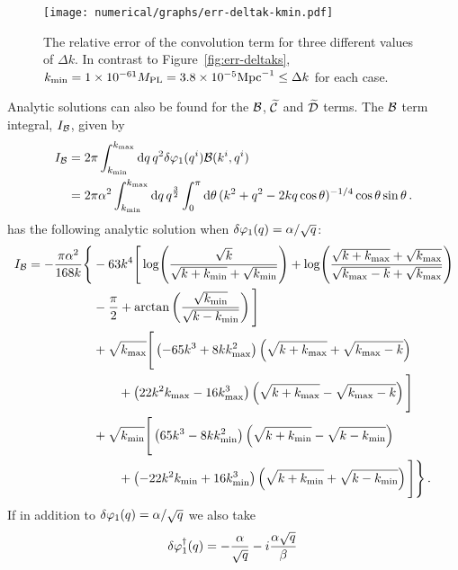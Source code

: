 \begin{figure}[htb]
 \centering
 \texttt{[image: numerical/graphs/err-deltak-kmin.pdf]}
 \caption[Relative error of the convolution term with fixed $\kmin$]{The 
relative error of the convolution term for three different values of $\Delta k$. In
contrast to Figure~\ref{fig:err-deltaks}, $k_{\mathrm{min}}=1\times 10^{-61}M_{\mathrm{PL}}=3.8\times 10^{-5}\mathrm{Mpc}^{-1} \le
\Delta k$ for each case.}
 \label{fig:err-deltak-kmin}
\end{figure}
 
% 
% 
Analytic solutions can also be found for the $\mathcal{B}$, $\widetilde{\mathcal{C}}$ and $\widetilde{\mathcal{D}}$ terms.
The $\mathcal{B}$ term integral, $I_{\mathcal{B}}$, given by
% 
\begin{align}
 \label{eq:bintegral-num}
I_\B &= 2\pi \int_{\kmin}^{\kmax} \d q\, q^2\dvp1(\qvi)\B(\kvi,\qvi) \nonumber\\
% 
     &= 2\pi\alpha^2 \int_{\kmin}^{\kmax} \d q\, q^{\frac{3}{2}}
\int_{0}^{\pi} \d\theta\, (k^2 + q^2 -2k q \cos{\theta})^{-1/4}
\cos{\theta}\sin{\theta}\,. 
\end{align}
% 
has the following analytic solution when $\delta\varphi_{1}(q) = \alpha/\sqrt{q}$:
% 
\begin{align}
\label{eq:intb-soln-num}
 I_\B = -\frac{\pi\alpha^2}{168 k}\Bigg\{ 
	&-63 k^4 \Bigg[ \log\Biggl(\frac{\sqrt{k}}{\sqrt{k+\kmin} + \sqrt{\kmin}}
			    \Biggr)
	 + \log\Biggl( \frac{\sqrt{k+\kmax} +\sqrt{\kmax}}{\sqrt{\kmax-k} +
		      \sqrt{\kmax}}\Biggr) \nonumber \\
	&-\frac{\pi}{2} + \arctan\left( \frac{\sqrt{\kmin}}{\sqrt{k-\kmin}}\right)
	\Bigg] \nonumber\\
% 
        &+\sqrt{\kmax}\Bigg[ \left(-65k^3 + 8k\kmax^2 \right)\left(\sqrt{k+\kmax} +
	  \sqrt{\kmax-k}\right) \nonumber \\
	&\qquad +\left(22k^2\kmax -16\kmax^3\right) \left(\sqrt{k+\kmax} -
         \sqrt{\kmax -k} \right) \Bigg] \nonumber \\
	&+\sqrt{\kmin}\Bigg[ \left(65k^3 - 8k\kmin^2 \right)\left(\sqrt{k+\kmin} -
	  \sqrt{k-\kmin}\right) \nonumber \\
	&\qquad +\left(-22k^2\kmin +16\kmin^3\right) \left(\sqrt{k+\kmin} +
         \sqrt{k-\kmin} \right) \Bigg] \Bigg\} \,.
\end{align}
% 
If in addition to $\delta\varphi_{1}(q) = \alpha/\sqrt{q}$ we also take
% 
\begin{equation}
 \delta\varphi_{1}^{\dagger}(q) = -\frac{\alpha}{\sqrt{q}} -i\frac{\alpha\sqrt{q}}{\beta}\,
\end{equation}
